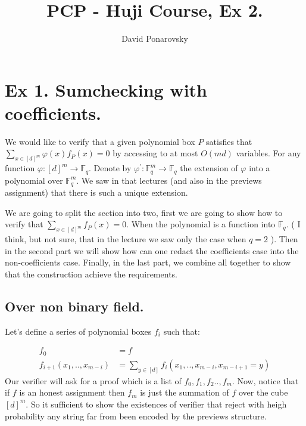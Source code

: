 \documentclass{article}
\title{PCP - Huji Course, Ex 2.}
\author{David Ponarovsky}
\newcommand{\FF}{\mathbb{F}_{q}}
\begin{document}
\maketitle

\section{Ex 1. Sumchecking with coefficients.}

We would like to verify that a given polynomial box $P$ satisfies that $ \sum_{x\in [d]^{m}}{ \varphi\left( x \right) f_{P}\left( x \right) } = 0 $  by accessing to at most $O\left(md\right)$ variables. For any function $\varphi : [d]^{m} \rightarrow \FF$. Denote by $\varphi^{\prime} : \FF^{m} \rightarrow \FF$ the extension of $\varphi$ into a polynomial over $\FF^{m}$. We saw in that lectures (and also in the previews assignment) that there is such a unique extension. 

We are going to split the section into two, first we are going to show how to verify that $\sum_{x \in [d]^{m}}{ f_{P}\left( x \right) } = 0 $. When the polynomial is a function into $\FF$. ( I think, but not sure, that in the lecture we saw only the case when $q = 2$ ). Then in the second part we will show how can one redact the coefficients case into the non-coefficients case. Finally, in the last part, we combine all together to show that the construction achieve the requirements. 


\subsection{Over non binary field. } Let's define a series of polynomial boxes $f_{i}$ such that: 

\begin{equation*}
  \begin{split}
    f_{0} & = f \\ 
  f_{i+1} \left( x_{1}, .. , x_{m-i} \right) & = \sum_{y \in [d] } f_{i}\left(x_{1}, .. , x_{m-i}, x_{m-i+1} = y \right)
  \end{split}
\end{equation*}
Our verifier will ask for a proof which is a list of $f_{0}, f_{1}, f_{2} .., f_{m}$. Now, notice that if $f$ is an honest assignment then $f_{m}$ is just the summation of $f$ over the cube $[d]^{m}$. So it sufficient to show the existences of verifier that reject with heigh probability any string far from been encoded by the previews structure.
\end{document}
